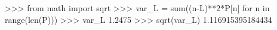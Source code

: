 
>>> from math import sqrt
>>> var_L = sum((n-L)**2*P[n] for n in range(len(P)))
>>> var_L
1.2475
>>> sqrt(var_L)
1.116915395184434

